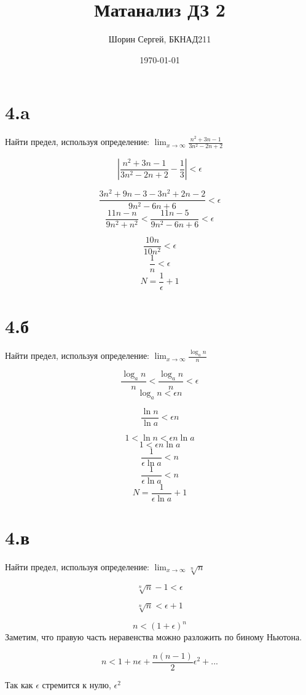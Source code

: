 \documentclass[a4paper]{article}
\author{Шорин Сергей, БКНАД211}
\title{Матанализ ДЗ 2}
\date{\today}
\begin{document}
\maketitle

\newpage

\section{4.a}
Найти предел, используя определение: 
$\displaystyle{\lim_{x \to \infty}} \frac{n^2 + 3n - 1}{3n^2 - 2n + 2}$

$$|\frac{n^2 + 3n - 1}{3n^2 - 2n + 2} - \frac{1}{3}| < \epsilon $$

$$\frac{3n^2 + 9n - 3 - 3n^2 + 2n - 2 }{9n^2 - 6n + 6} < \epsilon $$
$$\frac{ 11n - n}{9n^2 + n^2} < \frac{ 11n - 5}{9n^2 - 6n + 6} < \epsilon $$

$$\frac{ 10n}{10n^2} < \epsilon $$
$$\frac{ 1}{n} < \epsilon $$
$$N = \frac{ 1}{\epsilon} + 1 $$

\section{4.б}
Найти предел, используя определение: 
$\displaystyle{\lim_{x \to \infty}} \frac{\log_an}{n}$

$$ \frac{\log_an}{n} < \frac{\log_an}{n} < \epsilon $$
$$ \log_an < \epsilon n $$

$$ \frac{\ln n}{\ln a} < \epsilon n $$

$$ 1 < \ln n < \epsilon n \ln a $$
$$ 1 < \epsilon n \ln a $$
$$ \frac{1}{\epsilon \ln a} <  n  $$
$$ \frac{1}{\epsilon \ln a} <  n  $$
$$ N = \frac{1}{\epsilon \ln a} + 1  $$

\section{4.в}
Найти предел, используя определение: 
$\displaystyle{\lim_{x \to \infty}} \sqrt[n]{n}$

$$\sqrt[n]{n} - 1 < \epsilon$$

$$\sqrt[n]{n}  < \epsilon + 1$$ 

$$ n  < (1 + \epsilon ) ^ n$$ 
Заметим, что правую часть неравенства можно разложить по биному Ньютона.

$$ n  < 1 + n\epsilon + \frac{n(n-1)}{2}\epsilon^2 + ... $$ 

Так как $\epsilon$ стремится к нулю, $\epsilon^2$ 
\end{document}
